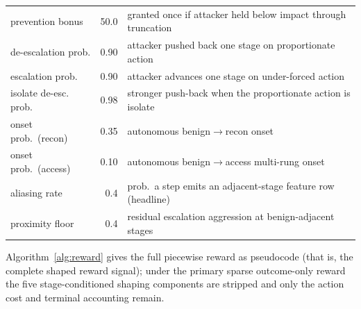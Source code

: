 \begin{table}[!htbp]
\begin{tabularx}{\textwidth}{lrX}
prevention bonus             & 50.0  & granted once if attacker held below impact through truncation \\
de-escalation prob.          & 0.90  & attacker pushed back one stage on proportionate action \\
escalation prob.             & 0.90  & attacker advances one stage on under-forced action \\
isolate de-esc. prob.        & 0.98  & stronger push-back when the proportionate action is isolate \\
onset prob.\ (recon)         & 0.35  & autonomous benign$\to$recon onset \\
onset prob.\ (access)        & 0.10  & autonomous benign$\to$access multi-rung onset \\
aliasing rate                & 0.4   & prob.\ a step emits an adjacent-stage feature row (headline) \\
proximity floor              & 0.4   & residual escalation aggression at benign-adjacent stages \\
\bottomrule
\end{tabularx}
\end{table}

Algorithm~\ref{alg:reward} gives the full piecewise reward as pseudocode (that is, the complete shaped reward signal); under the primary sparse outcome-only reward the five stage-conditioned shaping components are stripped and only the action cost and terminal accounting remain.

